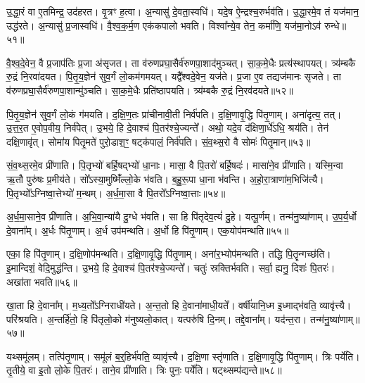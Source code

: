 उ॒द्धा॒रं वा ए॒तमिन्द्र॒ उद॑हरत।
वृ॒त्रꣳ ह॒त्वा।
अ॒न्यासु॑ दे॒वता॒स्वधि॑।
यदे॒ष ऐ॒न्द्रश्च॒रुर्भव॑ति।
उ॒द्धा॒रमे॒व तं यज॑मान॒ उद्ध॑रते।
अ॒न्यासु॑ प्र॒जास्वधि॑।
वै॒श्व॒क॒र्म॒ण एक॑कपालो भवति।
विश्वा᳚न्ये॒व तेन॒ कर्मा॑णि॒ यज॑मा॒नो\-ऽव॑ रुन्धे॥५१॥\ip\anuvakamend[ऋ॒द्ध्य॒ते॒\-ऽभ्य॑ञ्जते जुहोति वृणामहै भवत्य॒ष्टौ च॑]

वै॒श्व॒दे॒वेन॒ वै प्र॒जा\-प॑तिः प्र॒जा अ॑\-सृजत।
ता व॑रुण\-प्रघा॒सैर्व॑रुण\-पा॒शाद॑मुञ्चत्।
सा॒क॒मे॒धैः प्रत्य॑स्थापयत्।
त्र्य॑म्बकै रु॒द्रं नि॒रवा॑दयत।
पि॒तृ॒य॒ज्ञेन॑ सुव॒र्गं लो॒कम॑गमयत्।
यद्वै᳚श्वदे॒वेन॒ यज॑ते।
प्र॒जा ए॒व तद्यज॑मानः \-सृजते।
ता व॑रुणप्रघा॒सैर्व॑रुणपा॒शान्मु॑ञ्चति।
सा॒क॒मे॒धैः प्रति॑\-ष्ठापयति।
त्र्य॑म्बकै रु॒द्रं नि॒रव॑दयते॥५२॥\ip

पि॒तृ॒य॒ज्ञेन॑ सुव॒र्गं लो॒कं ग॑मयति।
द॒क्षि॒ण॒तः प्रा॑चीनावी॒ती निर्व॑पति।
द॒क्षि॒णावृ॒द्धि पि॑तृ॒णाम्।
अना॑दृत्य॒ तत्।
उ॒त्त॒र॒त ए॒वोप॒वीय॒ निर्व॑पेत्।
उ॒भये॒ हि दे॒वाश्च॑ पि॒तर॑श्चे॒ज्यन्ते᳚।
अथो॒ यदे॒व द॑क्षिणा॒र्धे॑ऽधि॒ श्रय॑ति।
तेन॑ दक्षि॒णावृ॑त्।
सोमा॑य पितृ॒मते॑ पुरो॒डाश॒ꣳ॒ षट्क॑पालं॒ निर्व॑पति।
सं॒व॒थ्स॒रो वै सोमः॑ पितृ॒मान्॥५३॥\ip

सं॒व॒थ्स॒रमे॒व प्री॑णाति।
पि॒तृभ्यो॑ बर्\mbox{}हि॒षद्भ्यो॑ धा॒नाः।
मासा॒ वै पि॒तरो॑ बर्\mbox{}हि॒षदः॑।
मासा॑ने॒व प्री॑णाति।
यस्मि॒न्वा ऋ॒तौ पुरु॑षः प्र॒मीय॑ते।
सो᳚ऽस्या॒मुष्मिँ॑ल्लो॒के भ॑वति।
ब॒हु॒रू॒पा धा॒ना भ॑वन्ति।
अ॒हो॒रा॒त्राणा॑म॒भिजि॑त्यै।
पि॒तृभ्यो᳚\-ऽग्निष्वा॒त्तेभ्यो॑ म॒न्थम्।
अ॒र्ध॒मा॒सा वै पि॒तरो᳚\-ऽग्निष्वा॒त्ताः॥५४॥\ip

अ॒र्ध॒मा॒साने॒व प्री॑णाति।
अ॒भि॒वा॒न्या॑यै दु॒ग्धे भ॑वति।
सा हि पि॑तृदेव॒त्यं॑ दु॒हे।
यत्पू॒र्णम्।
तन्म॑नु॒ष्या॑णाम्।
उ॒प॒र्य॒र्धो दे॒वाना᳚म्।
अ॒र्धः पि॑तृ॒णाम्।
अ॒र्ध उप॑मन्थति।
अ॒र्धो हि पि॑तृ॒णाम्।
एक॒योप॑मन्थति॥५५॥\ip

एका॒ हि पि॑तृ॒णाम्।
द॒क्षि॒णोप॑मन्थति।
द॒क्षि॒णावृ॒द्धि पि॑तृ॒णाम्।
अना॑र॒भ्योप॑मन्थति।
तद्धि पि॒तॄन्गच्छ॑ति।
इ॒मान्दिशं॒ वेदि॒मुद्ध॑न्ति।
उ॒भये॒ हि दे॒वाश्च॑ पि॒तर॑श्चे॒ज्यन्ते᳚।
चतुः॑ स्रक्तिर्भवति।
सर्वा॒ ह्यनु॒ दिशः॑ पि॒तरः॑।
अखा॑ता भवति॥५६॥\ip

खा॒ता हि दे॒वाना᳚म्।
म॒ध्य॒तो᳚\-ऽग्निराधी॑यते।
अ॒न्त॒तो हि दे॒वाना॑माधी॒यते᳚।
वर्\mbox{}षी॑यानि॒ध्म इ॒ध्माद्भ॑वति॒ व्यावृ॑त्त्यै।
परि॑श्रयति।
अ॒न्तर्\mbox{}हि॑तो॒ हि पि॑तृलो॒को म॑नुष्यलो॒कात्।
यत्परु॑षि दि॒नम्।
तद्दे॒वाना᳚म्।
यद॑न्त॒रा।
तन्म॑नु॒ष्या॑णाम्॥५७॥\ip

यथ्समू॑लम्।
तत्पि॑तृ॒णाम्।
समू॑लं ब॒र्॒हिर्भ॑वति॒ व्यावृ॑त्त्यै।
द॒क्षि॒णा स्तृ॑णाति।
द॒क्षि॒णावृ॒द्धि पि॑तृ॒णाम्।
त्रिः पर्ये॑ति।
तृ॒तीये॒ वा इ॒तो लो॒के पि॒तरः॑।
ताने॒व प्री॑णाति।
त्रिः पुनः॒ पर्ये॑ति।
षट्थ्सम्प॑द्यन्ते॥५८॥\ip

